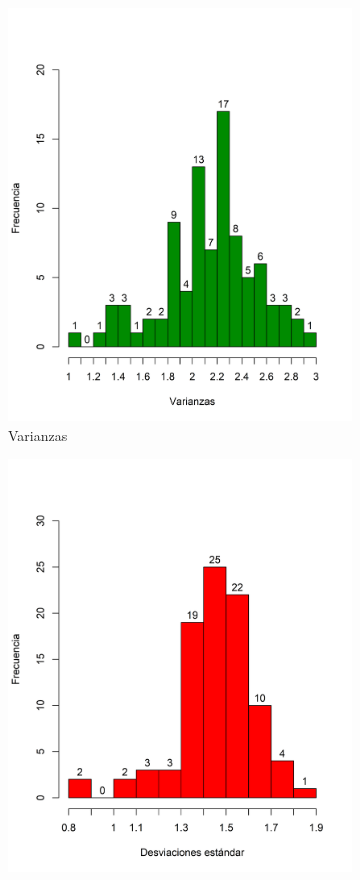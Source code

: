 \documentclass{article}
\begin{document}
\begin{figure}[htp]
\begin{center}
\begin{subfigure}{0.45\textwidth}
        \includegraphics[scale=0.55]{Figures/dadosVar.png}
        \caption{Varianzas}
        \label{dadosVar}
    \end{subfigure}
    \begin{subfigure}{0.45\textwidth}
        \includegraphics[scale=0.55]{Figures/dadosDesv.png}

\end{subfigure}
\end{center}
\end{figure}
\end{document}
